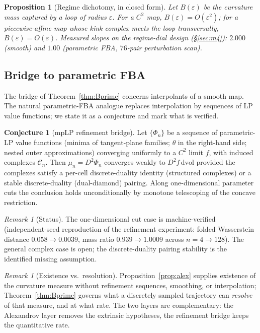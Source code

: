 \documentclass[11pt,a4paper]{article}
\theoremstyle{plain}
\newtheorem{proposition}[theorem]{Proposition}
\theoremstyle{definition}
\newtheorem{conjecture}[theorem]{Conjecture}
\theoremstyle{remark}
\newtheorem{remark}[theorem]{Remark}
\newcommand{\dvol}{\,\mathrm{dvol}}
\begin{document}
\begin{proposition}[Regime dichotomy, in closed form]
\label{prop:dichotomy}
Let $B(\varepsilon)$ be the curvature mass captured by a loop of radius
$\varepsilon$. For a $C^2$ map, $B(\varepsilon) = O(\varepsilon^2)$; for a
piecewise-affine map whose kink complex meets the loop transversally,
$B(\varepsilon) = O(\varepsilon)$. Measured slopes on the regime-dial design (\S\ref{sec:m4}): $2.000$ (smooth) and $1.00$ (parametric FBA,
$76$-pair perturbation scan).
\end{proposition}

\subsection{Bridge to parametric FBA}

The bridge of Theorem~\ref{thm:Bprime} concerns interpolants of a
smooth map. The natural parametric-FBA analogue replaces interpolation
by sequences of LP value functions; we state it as a conjecture and
mark what is verified.

\begin{conjecture}[mpLP refinement bridge]\label{conj:bridge}
Let $\{\Phi_n\}$ be a sequence of parametric-LP value functions (minima of
tangent-plane families; $\theta$ in the right-hand side; nested outer
approximations) converging uniformly to a $C^2$ limit $f$, with induced
complexes $\mathcal{C}_n$. Then $\mu_n = D^2\Phi_n$ converges weakly to
$D^2 f \dvol$ provided the complexes satisfy a per-cell discrete-duality
identity (structured complexes) or a stable discrete-duality
(dual-diamond) pairing. Along one-dimensional parameter cuts the
conclusion holds unconditionally by monotone telescoping of the concave
restriction.
\end{conjecture}

\begin{remark}[Status]
The one-dimensional cut case is machine-verified (independent-seed
reproduction of the refinement experiment: folded Wasserstein distance
$0.058 \to 0.0039$, mass ratio $0.939 \to 1.0009$ across
$n = 4 \to 128$). The general complex case is open; the discrete-duality
pairing stability is the identified missing assumption.
\end{remark}

\begin{remark}[Existence vs.\ resolution]
Proposition~\ref{prop:alex} supplies existence of the curvature measure
without refinement sequences, smoothing, or interpolation; Theorem~\ref{thm:Bprime} governs what a discretely sampled trajectory can \emph{resolve} of that
measure, and at what rate. The two layers are complementary: the
Alexandrov layer removes the extrinsic hypotheses, the refinement
bridge keeps the quantitative rate.
\end{remark}
\end{document}
